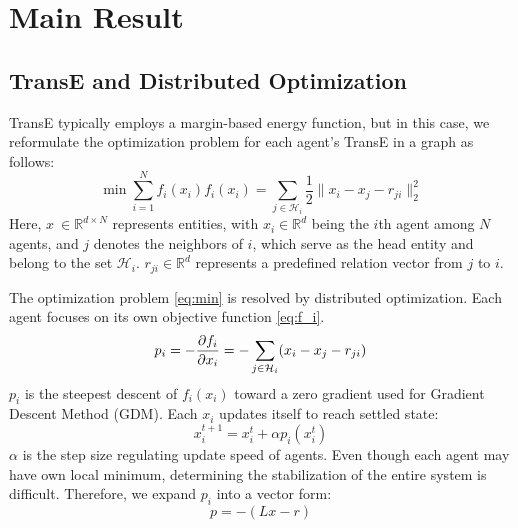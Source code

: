 \documentclass[letterpaper, 10 pt, conference]{ieeeconf}  %
\begin{document}
\section{Main Result}

\subsection{TransE and Distributed Optimization}

TransE typically employs a margin-based energy function, but in this case, we reformulate the optimization problem for each agent's TransE in a graph as follows:
\begin{subequations}
\begin{equation}\label{eq:min}
    \min \sum_{i=1}^{N} f_{i} (x_{i})
\end{equation}
\begin{equation}\label{eq:f_i}
    f_{i}(x_{i}) = \sum_{j \in \mathcal{H}_{i}} \frac{1}{2} \|x_{i} - x_{j} - r_{ji}\|_{2}^{2}
\end{equation}
\end{subequations}
Here, \( x \ \in \mathbb{R}^{d \times N} \) represents entities, with \( x_i \in \mathbb{R}^d \) being the \(i\)th agent among \( N \) agents, and \( j \) denotes the neighbors of \( i \), which serve as the head entity and belong to the set \( \mathcal{H}_{i} \). \( r_{ji} \in \mathbb{R}^d \) represents a predefined relation vector from \( j \) to \( i \). 

The optimization problem \eqref{eq:min} is resolved by distributed optimization. Each agent focuses on its own objective function \eqref{eq:f_i}. %
\begin{equation}
    p_i = - \pdv{f_{i}}{x_{i}} = - \sum_{j \in \mathcal{H}_i} (x_{i} - x_{j} - r_{ji})
    \label{eq:p}
\end{equation}
\( p_i \) is the steepest descent of \( f_i(x_i) \) toward a zero gradient used for Gradient Descent Method (GDM). Each \( x_i \) updates itself to reach settled state:
\begin{equation}
    x_{i}^{t+1} = x_i^t + \alpha p_i(x_i^t)
    \label{eq:update}
\end{equation}
\( \alpha \) is the step size regulating update speed of agents. Even though each agent may have own local minimum, determining the stabilization of the entire system is difficult. Therefore, we expand \( p_i \) into a vector form:
\begin{equation}
    p = - (Lx - r)
    \label{eq:p_vector}
\end{equation}
\end{document}
